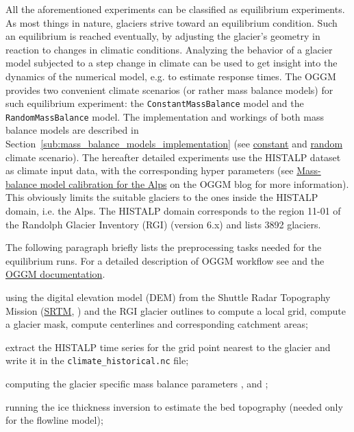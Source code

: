     All the aforementioned experiments can be classified as equilibrium experiments. As most things in nature, glaciers strive toward an equilibrium condition. Such an equilibrium is reached eventually, by adjusting the glacier's geometry in reaction to changes in climatic conditions. Analyzing the behavior of a glacier model subjected to a step change in climate can be used to get insight into the dynamics of the numerical model, e.g. to estimate response times. The OGGM provides two convenient climate scenarios (or rather mass balance models) for such equilibrium experiment: the \lstinline`ConstantMassBalance` model and the \lstinline`RandomMassBalance` model. The implementation and workings of both mass balance models are described in Section~\ref{sub:mass_balance_models_implementation} (see \hyperref[ssub:constant_climate_scenario_implementation]{constant} and \hyperref[ssub:random_climate_scenario_implementation]{random} climate scenario). The hereafter detailed experiments use the HISTALP dataset \citep{Auer2007} as climate input data, with the corresponding hyper parameters (see  \href{https://oggm.org/2018/08/10/histalp-parameters/}{Mass-balance model calibration for the Alps} \citep{Dusch2018} on the OGGM blog for more information). This obviously limits the suitable glaciers to the ones inside the HISTALP domain, i.e. the Alps. The HISTALP domain corresponds to the region 11-01 of the Randolph Glacier Inventory (RGI) \citep{RGI2017,Pfeffer2014} (version 6.x) and lists 3892 glaciers.

    The following paragraph briefly lists the preprocessing tasks needed for the equilibrium runs. For a detailed description of OGGM workflow see \citet{Maussion2019} and the \href{https://docs.oggm.org}{OGGM documentation}.
    \begin{description}[noitemsep]
        \item[GIS tasks:] using the digital elevation model (DEM) from the Shuttle Radar Topography Mission (\href{http://srtm.csi.cgiar.org/}{SRTM}, \citet{Jarvis2008}) and the RGI glacier outlines to compute a local grid, compute a glacier mask, compute centerlines and corresponding catchment areas;
        \item[climate tasks:] extract the HISTALP time series for the grid point nearest to the glacier and write it in the \lstinline`climate_historical.nc` file;
        \item[mass balance calibration:] computing the glacier specific mass balance parameters \tstar{}, \mustar{} and \bias{};
        \item[inversion tasks:] running the ice thickness inversion to estimate the bed topography (needed only for the flowline model);
    \end{description}

